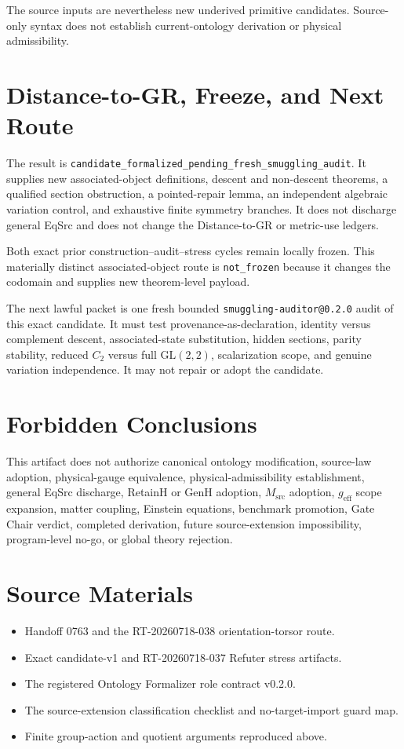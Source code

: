 \documentclass[11pt]{article}
\begin{document}
The source inputs are nevertheless new underived primitive candidates.
Source-only syntax does not establish current-ontology derivation or physical
admissibility.

\section{Distance-to-GR, Freeze, and Next Route}

The result is
\texttt{candidate\_formalized\_pending\_fresh\_smuggling\_audit}. It supplies
new associated-object definitions, descent and non-descent theorems, a
qualified section obstruction, a pointed-repair lemma, an independent
algebraic variation control, and exhaustive finite symmetry branches. It does
not discharge general EqSrc and does not change the Distance-to-GR or
metric-use ledgers.

Both exact prior construction--audit--stress cycles remain locally frozen.
This materially distinct associated-object route is
\texttt{not\_frozen} because it changes the codomain and supplies new
theorem-level payload.

The next lawful packet is one fresh bounded
\texttt{smuggling-auditor@0.2.0} audit of this exact candidate. It must test
provenance-as-declaration, identity versus complement descent,
associated-state substitution, hidden sections, parity stability, reduced
\(C_2\) versus full \(\mathrm{GL}(2,2)\), scalarization scope, and genuine
variation independence. It may not repair or adopt the candidate.

\section{Forbidden Conclusions}

This artifact does not authorize canonical ontology modification, source-law
adoption, physical-gauge equivalence, physical-admissibility establishment,
general EqSrc discharge, RetainH or GenH adoption,
\(M_{\mathrm{src}}\) adoption, \(g_{\mathrm{eff}}\) scope expansion, matter
coupling, Einstein equations, benchmark promotion, Gate Chair verdict,
completed derivation, future source-extension impossibility, program-level
no-go, or global theory rejection.

\section{Source Materials}

\begin{itemize}[leftmargin=*]
  \item Handoff 0763 and the RT-20260718-038 orientation-torsor route.
  \item Exact candidate-v1 and RT-20260718-037 Refuter stress artifacts.
  \item The registered Ontology Formalizer role contract v0.2.0.
  \item The source-extension classification checklist and no-target-import
  guard map.
  \item Finite group-action and quotient arguments reproduced above.
\end{itemize}
\end{document}
